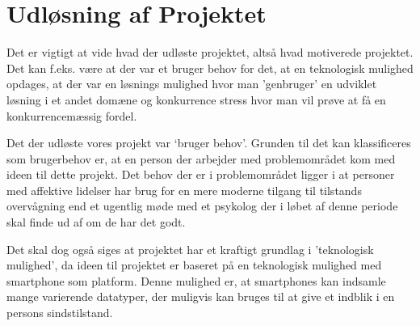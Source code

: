 \section{Udløsning af Projektet}
Det er vigtigt at vide hvad der udløste projektet, altså hvad motiverede projektet. 
Det kan f.eks. være at der var et bruger behov for det, at en teknologisk mulighed opdages, at der var en løsnings mulighed hvor man 'genbruger' en udviklet løsning i et andet domæne og konkurrence stress hvor man vil prøve at få en konkurrencemæssig fordel. 

Det der udløste vores projekt var `bruger behov'.
Grunden til det kan klassificeres som brugerbehov er, at en person der arbejder med problemområdet kom med ideen til dette projekt. 
Det behov der er i problemområdet ligger i at personer med affektive lidelser har brug for en mere moderne tilgang til tilstands overvågning end et ugentlig møde med et psykolog der i løbet af denne periode skal finde ud af om de har det godt.

Det skal dog også siges at projektet har et kraftigt grundlag i 'teknologisk mulighed', da ideen til projektet er baseret på en teknologisk mulighed med smartphone som platform.
Denne mulighed er, at smartphones kan indsamle mange varierende datatyper, der muligvis kan bruges til at give et indblik i en persons sindstilstand.
